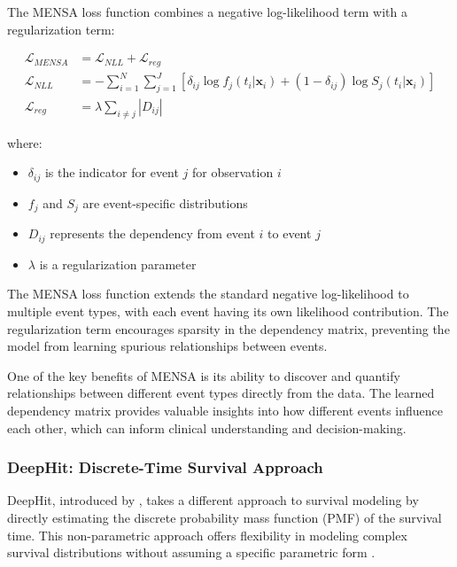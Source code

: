 \begin{equationbox}[title=MENSA Loss Function]
  The MENSA loss function combines a negative log-likelihood term with a regularization term:

  \begin{align}
    \mathcal{L}_{MENSA} &= \mathcal{L}_{NLL} + \mathcal{L}_{reg} \\
    \mathcal{L}_{NLL} &= -\sum_{i=1}^N \sum_{j=1}^J \left[ \delta_{ij} \log f_j(t_i|\mathbf{x}_i) + (1-\delta_{ij}) \log S_j(t_i|\mathbf{x}_i) \right] \\
    \mathcal{L}_{reg} &= \lambda \sum_{i \neq j} |D_{ij}|
  \end{align}

  where:
  \begin{itemize}
  \item $\delta_{ij}$ is the indicator for event $j$ for observation $i$
  \item $f_j$ and $S_j$ are event-specific distributions
  \item $D_{ij}$ represents the dependency from event $i$ to event $j$
  \item $\lambda$ is a regularization parameter
  \end{itemize}
\end{equationbox}

The MENSA loss function extends the standard negative log-likelihood to multiple event types, with each event having its own likelihood contribution. The regularization term encourages sparsity in the dependency matrix, preventing the model from learning spurious relationships between events.

One of the key benefits of MENSA is its ability to discover and quantify relationships between different event types directly from the data. The learned dependency matrix provides valuable insights into how different events influence each other, which can inform clinical understanding and decision-making.

\subsubsection{DeepHit: Discrete-Time Survival Approach}

DeepHit, introduced by \textcite{lee2018}, takes a different approach to survival modeling by directly estimating the discrete probability mass function (PMF) of the survival time. This non-parametric approach offers flexibility in modeling complex survival distributions without assuming a specific parametric form \parencite{gensheimer2019}.

